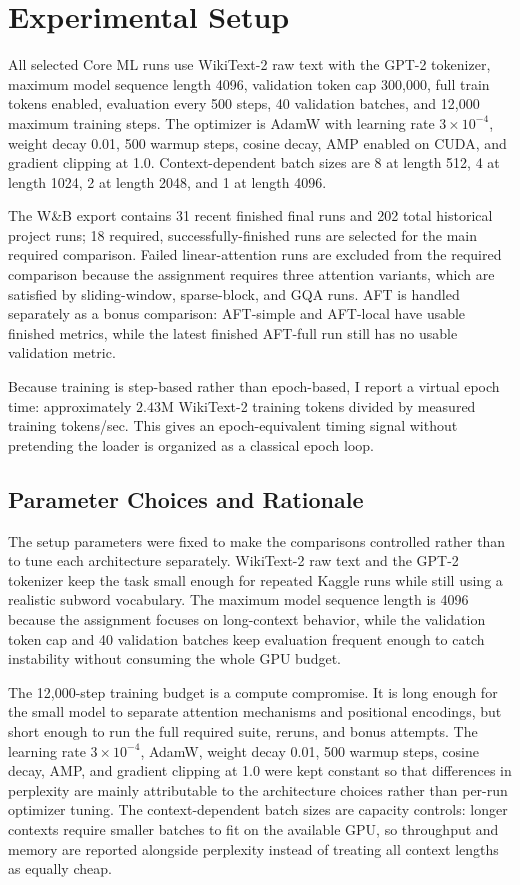 \documentclass[11pt]{article}
\begin{document}
\section{Experimental Setup}
All selected Core ML runs use WikiText-2 raw text with the GPT-2 tokenizer, maximum model sequence length 4096, validation token cap 300,000, full train tokens enabled, evaluation every 500 steps, 40 validation batches, and 12,000 maximum training steps. The optimizer is AdamW with learning rate $3\times10^{-4}$, weight decay 0.01, 500 warmup steps, cosine decay, AMP enabled on CUDA, and gradient clipping at 1.0. Context-dependent batch sizes are 8 at length 512, 4 at length 1024, 2 at length 2048, and 1 at length 4096.

The W\&B export contains 31 recent finished final runs and 202 total historical project runs; 18 required, successfully-finished runs are selected for the main required comparison. Failed linear-attention runs are excluded from the required comparison because the assignment requires three attention variants, which are satisfied by sliding-window, sparse-block, and GQA runs. AFT is handled separately as a bonus comparison: AFT-simple and AFT-local have usable finished metrics, while the latest finished AFT-full run still has no usable validation metric.

Because training is step-based rather than epoch-based, I report a virtual epoch time: approximately $2.43$M WikiText-2 training tokens divided by measured training tokens/sec. This gives an epoch-equivalent timing signal without pretending the loader is organized as a classical epoch loop.

\subsection{Parameter Choices and Rationale}
The setup parameters were fixed to make the comparisons controlled rather than to tune each architecture separately. WikiText-2 raw text and the GPT-2 tokenizer keep the task small enough for repeated Kaggle runs while still using a realistic subword vocabulary. The maximum model sequence length is 4096 because the assignment focuses on long-context behavior, while the validation token cap and 40 validation batches keep evaluation frequent enough to catch instability without consuming the whole GPU budget.

The 12,000-step training budget is a compute compromise. It is long enough for the small model to separate attention mechanisms and positional encodings, but short enough to run the full required suite, reruns, and bonus attempts. The learning rate $3\times10^{-4}$, AdamW, weight decay 0.01, 500 warmup steps, cosine decay, AMP, and gradient clipping at 1.0 were kept constant so that differences in perplexity are mainly attributable to the architecture choices rather than per-run optimizer tuning. The context-dependent batch sizes are capacity controls: longer contexts require smaller batches to fit on the available GPU, so throughput and memory are reported alongside perplexity instead of treating all context lengths as equally cheap.
\end{document}
